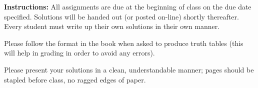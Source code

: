 \documentclass[12pt,addpoints]{exam}
\begin{document}
\extrawidth{0.5in} \extrafootheight{-0.75in} \pagestyle{headandfoot}
\headrule {} \footrule {}

\noindent \textbf{Instructions:} All assignments are due at the
beginning of class on the due date specified.  Solutions will be
handed out (or posted on-line) shortly thereafter.  Every student
must write up their own solutions in their own manner.

\noindent Please follow the format in the book when asked to produce
truth tables (this will help in grading in order to avoid any
errors).

\noindent Please present your solutions in a clean, understandable
manner; pages should be stapled before class, no ragged edges of
paper.

\end{document}

